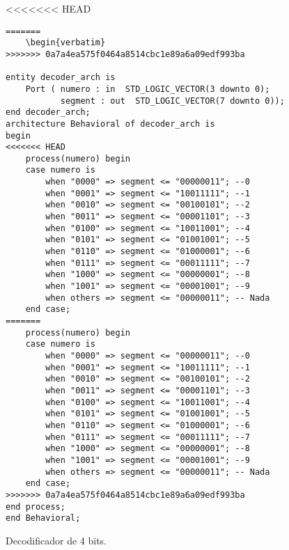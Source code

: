 \documentclass[paper=a4, fontsize=12pt]{article}        %
\numberwithin{equation}{section}                        %
\numberwithin{table}{section}                           %
\numberwithin{equation}{section}						%
\numberwithin{table}{section} 							%
\begin{document}
\begin{listing}[H]
<<<<<<< HEAD
    \begin{verbatim}
=======
	\begin{verbatim}
>>>>>>> 0a7a4ea575f0464a8514cbc1e89a6a09edf993ba

entity decoder_arch is
    Port ( numero : in  STD_LOGIC_VECTOR(3 downto 0);
           segment : out  STD_LOGIC_VECTOR(7 downto 0));
end decoder_arch;
architecture Behavioral of decoder_arch is
begin
<<<<<<< HEAD
    process(numero) begin
    case numero is
        when "0000" => segment <= "00000011"; --0
        when "0001" => segment <= "10011111"; --1
        when "0010" => segment <= "00100101"; --2
        when "0011" => segment <= "00001101"; --3
        when "0100" => segment <= "10011001"; --4
        when "0101" => segment <= "01001001"; --5
        when "0110" => segment <= "01000001"; --6
        when "0111" => segment <= "00011111"; --7
        when "1000" => segment <= "00000001"; --8
        when "1001" => segment <= "00001001"; --9
        when others => segment <= "00000011"; -- Nada
    end case;
=======
	process(numero) begin
	case numero is
		when "0000" => segment <= "00000011"; --0
		when "0001" => segment <= "10011111"; --1
		when "0010" => segment <= "00100101"; --2
		when "0011" => segment <= "00001101"; --3
		when "0100" => segment <= "10011001"; --4
		when "0101" => segment <= "01001001"; --5
		when "0110" => segment <= "01000001"; --6
		when "0111" => segment <= "00011111"; --7
		when "1000" => segment <= "00000001"; --8
		when "1001" => segment <= "00001001"; --9
		when others => segment <= "00000011"; -- Nada
	end case;
>>>>>>> 0a7a4ea575f0464a8514cbc1e89a6a09edf993ba
end process;
end Behavioral;

\end{verbatim}
\caption{Decodificador de 4 bits.}
    \label{decodificador}
\end{listing}
\end{document}
